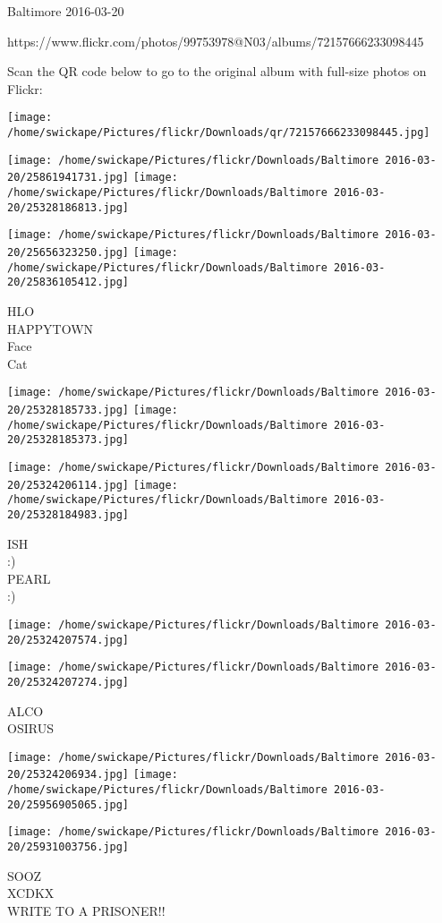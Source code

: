 \documentclass[10pt,letterpaper]{article}
\begin{document}
Baltimore 2016-03-20

https://www.flickr.com/photos/99753978@N03/albums/72157666233098445

Scan the QR code below to go to the original album with full-size photos on Flickr:

\texttt{[image: /home/swickape/Pictures/flickr/Downloads/qr/72157666233098445.jpg]}
\pagebreak

\texttt{[image: /home/swickape/Pictures/flickr/Downloads/Baltimore 2016-03-20/25861941731.jpg]}
\texttt{[image: /home/swickape/Pictures/flickr/Downloads/Baltimore 2016-03-20/25328186813.jpg]}

\texttt{[image: /home/swickape/Pictures/flickr/Downloads/Baltimore 2016-03-20/25656323250.jpg]}
\texttt{[image: /home/swickape/Pictures/flickr/Downloads/Baltimore 2016-03-20/25836105412.jpg]}

HLO\\
HAPPYTOWN\\
Face\\
Cat
\pagebreak

\texttt{[image: /home/swickape/Pictures/flickr/Downloads/Baltimore 2016-03-20/25328185733.jpg]}
\texttt{[image: /home/swickape/Pictures/flickr/Downloads/Baltimore 2016-03-20/25328185373.jpg]}

\texttt{[image: /home/swickape/Pictures/flickr/Downloads/Baltimore 2016-03-20/25324206114.jpg]}
\texttt{[image: /home/swickape/Pictures/flickr/Downloads/Baltimore 2016-03-20/25328184983.jpg]}

ISH\\
:)\\
PEARL\\
:)
\pagebreak

\texttt{[image: /home/swickape/Pictures/flickr/Downloads/Baltimore 2016-03-20/25324207574.jpg]}

\vspace{0.25in}
\texttt{[image: /home/swickape/Pictures/flickr/Downloads/Baltimore 2016-03-20/25324207274.jpg]}

ALCO\\
OSIRUS
\pagebreak

\texttt{[image: /home/swickape/Pictures/flickr/Downloads/Baltimore 2016-03-20/25324206934.jpg]}
\texttt{[image: /home/swickape/Pictures/flickr/Downloads/Baltimore 2016-03-20/25956905065.jpg]}

\texttt{[image: /home/swickape/Pictures/flickr/Downloads/Baltimore 2016-03-20/25931003756.jpg]}

SOOZ\\
XCDKX\\
WRITE TO A PRISONER!!
\pagebreak
\end{document}
